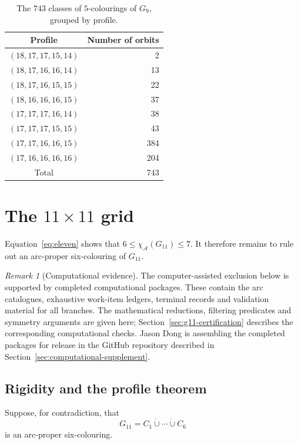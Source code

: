 \documentclass[11pt]{article}
\theoremstyle{definition}
\theoremstyle{remark}
\newtheorem{remark}[theorem]{Remark}
\renewcommand{\le}{\leqslant}
\begin{document}
\begin{table}[htbp]
\centering
\begin{tabular}{@{}cr@{}}
\toprule
Profile & Number of orbits\\
\midrule
\((18,17,17,15,14)\) & 2\\
\((18,17,16,16,14)\) & 13\\
\((18,17,16,15,15)\) & 22\\
\((18,16,16,16,15)\) & 37\\
\((17,17,17,16,14)\) & 38\\
\((17,17,17,15,15)\) & 43\\
\((17,17,16,16,15)\) & 384\\
\((17,16,16,16,16)\) & 204\\
\midrule
Total & 743\\
\bottomrule
\end{tabular}
\caption{The \(743\) classes of \(5\)-colourings of \(G_9\), grouped by
profile.}
\label{tab:nine-profiles}
\end{table}

\FloatBarrier
\section{The \texorpdfstring{\(11\times11\)}{11 x 11} grid}

Equation~\eqref{eq:eleven} shows that \(6\le \chi_{\mathcal{A}}(G_{11})\le7\).
It therefore remains to rule out an arc-proper six-colouring of \(G_{11}\).

\begin{remark}[Computational evidence]
The computer-assisted exclusion below is supported by completed computational
packages.  These contain the arc catalogues, exhaustive work-item ledgers,
terminal records and validation material for all branches.  The mathematical
reductions, filtering predicates and symmetry arguments are given here;
Section~\ref{sec:g11-certification} describes the corresponding computational
checks.  Jason Dong is assembling the completed packages for release in the
GitHub repository described in Section~\ref{sec:computational-supplement}.
\end{remark}

\subsection{Rigidity and the profile theorem}

Suppose, for contradiction, that
\[
  G_{11}=C_1\dot\cup\cdots\dot\cup C_6
\]
is an arc-proper six-colouring.
\end{document}
